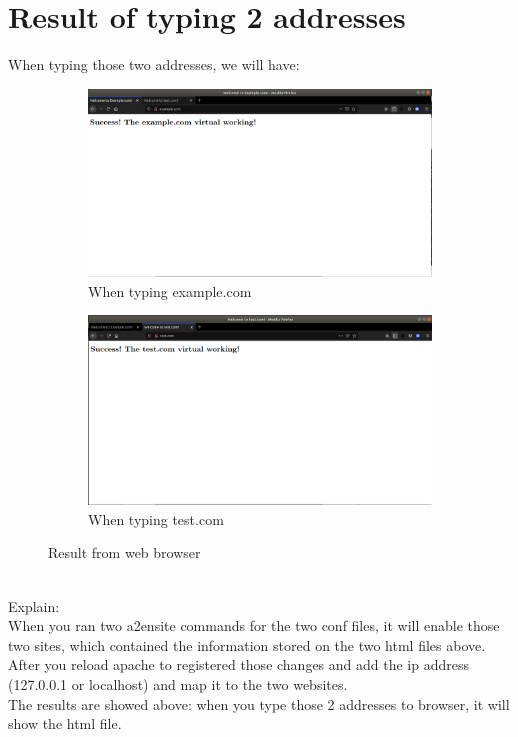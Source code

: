 \documentclass[11pt,a4paper]{article}
\begin{document}
	\section{Result of typing 2 addresses}
	When typing those two addresses, we will have:
	\begin{figure}[h!]
		\centering
  		\begin{subfigure}[b]{0.4\linewidth}
    		\includegraphics[width=\linewidth]{example-res.png}
    		\caption{When typing example.com}
  		\end{subfigure}
  		\begin{subfigure}[b]{0.4\linewidth}
    		\includegraphics[width=\linewidth]{test-res.png}
    		\caption{When typing test.com}
  		\end{subfigure}
  		\caption{Result from web browser}
  		\label{fig:webbrowserres}
	\end{figure}
	\\Explain:\\
	When you ran two a2ensite commands for the two conf files, it will enable those two sites, which contained the information stored on the two html files above. After you reload apache to registered those changes and add the ip address (127.0.0.1 or localhost) and map it to the two websites.
	\\The results are showed above: when you type those 2 addresses to browser, it will show the html file.
\end{document}
